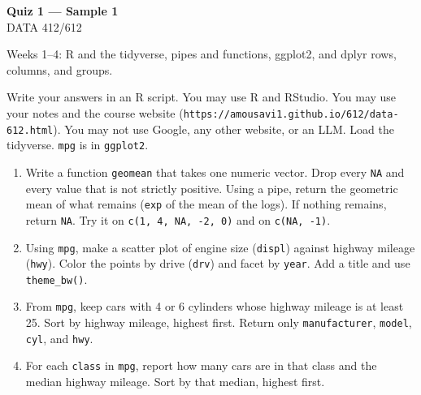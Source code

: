 \documentclass[11pt]{article}
\begin{document}
\begin{center}
{\LARGE\bfseries Quiz 1 --- Sample 1}\\[0.35em]
DATA 412/612
\end{center}

\vspace{0.3em}

Weeks 1--4: R and the tidyverse, pipes and functions, ggplot2,
and dplyr rows, columns, and groups.

Write your answers in an R script. You may use R and RStudio.
You may use your notes and the course website
(\texttt{https://amousavi1.github.io/612/data-612.html}).
You may not use Google, any other website, or an LLM.
Load the tidyverse. \texttt{mpg} is in \texttt{ggplot2}.

\begin{enumerate}
\item Write a function \texttt{geomean} that takes one numeric vector.
Drop every \texttt{NA} and every value that is not strictly positive.
Using a pipe, return the geometric mean of what remains
(\texttt{exp} of the mean of the logs).
If nothing remains, return \texttt{NA}.
Try it on \texttt{c(1, 4, NA, -2, 0)} and on \texttt{c(NA, -1)}.

\item Using \texttt{mpg}, make a scatter plot of engine size
(\texttt{displ}) against highway mileage (\texttt{hwy}).
Color the points by drive (\texttt{drv}) and facet by \texttt{year}.
Add a title and use \texttt{theme\_bw()}.

\item From \texttt{mpg}, keep cars with 4 or 6 cylinders whose highway
mileage is at least 25. Sort by highway mileage, highest first.
Return only \texttt{manufacturer}, \texttt{model}, \texttt{cyl}, and
\texttt{hwy}.

\item For each \texttt{class} in \texttt{mpg}, report how many cars are
in that class and the median highway mileage.
Sort by that median, highest first.
\end{enumerate}
\end{document}

